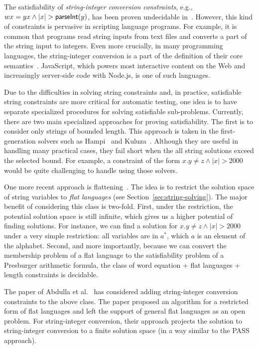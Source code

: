 The satisfiability of \emph{string-integer conversion constraints}, e.g., $wx=yx \wedge |x| > \textsf{parseInt}(y)$, has been proven undecidable in~\cite{DayGHMN18}. 
However, this kind of constraints is pervasive in scripting language programs. 
For example, it is common that programs read string inputs from text files and converts a part of the string input to integers.
Even more crucially, in many programming languages, the string-integer conversion is a part of the definition of their core semantics~\cite{ecmascript2019ecmascript}. 
JavaScript, which powers most interactive content on the Web and increasingly server-side code with Node.js, is one of such languages. 

Due to the difficulties in solving string constraints and, in practice, satisfiable string constraints are more critical for automatic testing, one idea is to have separate specialized procedures for solving satisfiable sub-problems. 
Currently, there are two main specialized approaches for proving satisfiability.
The first is to consider only strings of bounded length.
This approach is taken in the first-generation solvers such as Hampi~\cite{KiezunGAGHE12} and Kuluza~\cite{SaxenaAHMMS10}.
Although they are useful in handling many practical cases, they fail short when the all string solutions exceed the selected bound.
For example, a constraint of the form $x.y \neq z  \wedge |x| > 2000$ would be quite challenging to handle using those solvers.

One more recent approach is flattening~\cite{Parosh:20:PLDI,AbdullaACDHRR18,AbdullaACDHRR17}.
The idea is to restrict the solution space of string variables to 
\emph{flat languages} (see Section~\ref{sec:string-solving}). 
The major benefit of considering this class is two-fold.
First, under the restriction, the potential solution space is still infinite, which gives us a higher potential of finding solutions.
For instance, we can find a solution for $x.y \neq z  \wedge |x| > 2000$ under a very simple restriction: all variables are in $a^*$, which $a$ is an element of the alphabet.
Second, and more importantly, because we can convert the membership problem of a flat language to the satisfiability problem of a Presburger arithmetic formula, the class of word equation + flat languages + length constraints is decidable.

The paper of Abdulla et al.~\cite{Parosh:20:PLDI} has considered adding string-integer conversion constraints to the above class.
The paper proposed an algorithm for a restricted form of flat languages and left the support of general flat languages as an open problem.
For string-integer conversion, their approach projects the solution to string-integer conversion to
a finite solution space (in a way similar to the PASS~\cite{goudong2013pass} approach).

